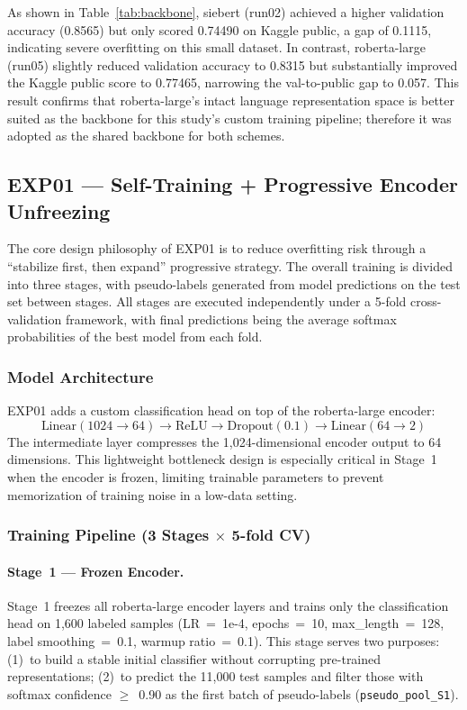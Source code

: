 \documentclass[10pt,twocolumn]{article}
\begin{document}
As shown in Table~\ref{tab:backbone}, siebert (run02) achieved a higher
validation accuracy (0.8565) but only scored 0.74490 on Kaggle public,
a gap of 0.1115, indicating severe overfitting on this small dataset.
In contrast, roberta-large (run05) slightly reduced validation accuracy
to 0.8315 but substantially improved the Kaggle public score to 0.77465,
narrowing the val-to-public gap to 0.057. This result confirms that
roberta-large's intact language representation space is better suited
as the backbone for this study's custom training pipeline; therefore it
was adopted as the shared backbone for both schemes.

\subsection{EXP01 --- Self-Training + Progressive Encoder Unfreezing}

The core design philosophy of EXP01 is to reduce overfitting risk
through a ``stabilize first, then expand'' progressive strategy. The
overall training is divided into three stages, with pseudo-labels
generated from model predictions on the test set between stages. All
stages are executed independently under a 5-fold cross-validation
framework, with final predictions being the average softmax
probabilities of the best model from each fold.

\subsubsection{Model Architecture}
EXP01 adds a custom classification head on top of the roberta-large
encoder:
\[
  \text{Linear}(1024{\to}64) \to \text{ReLU} \to \text{Dropout}(0.1)
  \to \text{Linear}(64{\to}2)
\]
The intermediate layer compresses the 1,024-dimensional encoder output
to 64 dimensions. This lightweight bottleneck design is especially
critical in Stage~1 when the encoder is frozen, limiting trainable
parameters to prevent memorization of training noise in a low-data
setting.

\subsubsection{Training Pipeline (3 Stages $\times$ 5-fold CV)}

\paragraph{Stage~1 --- Frozen Encoder.}
Stage~1 freezes all roberta-large encoder layers and trains only the
classification head on 1,600 labeled samples (LR~=~1e-4, epochs~=~10,
max\_length~=~128, label smoothing~=~0.1, warmup ratio~=~0.1). This
stage serves two purposes: (1)~to build a stable initial classifier
without corrupting pre-trained representations; (2)~to predict the
11,000 test samples and filter those with softmax confidence
$\geq$~0.90 as the first batch of pseudo-labels
(\texttt{pseudo\_pool\_S1}).
\end{document}
